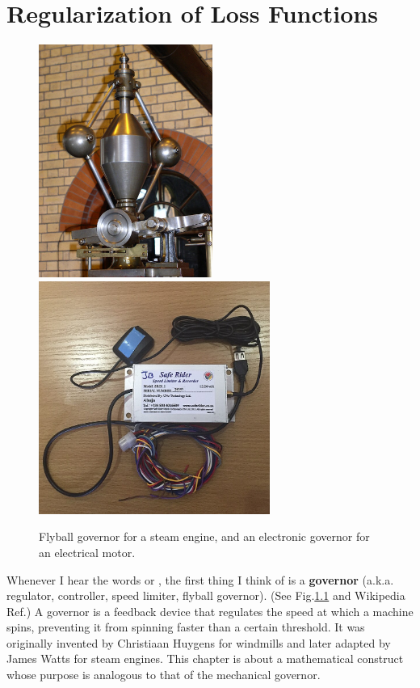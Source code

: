 \chapter{Regularization of Loss Functions}
\label{ch-regularization}

\begin{figure}[h!]
\centering
\includegraphics[height=3in]
{regularization/steam-guv.png}
\includegraphics[height=3in]
{regularization/electronic-guv.png}
\caption{Flyball governor for a steam engine, and an electronic governor for an electrical motor.}
\label{fig-guv-device}
\end{figure}

Whenever I hear the words  or , the first 
thing I think of is a
{\bf governor} (a.k.a. regulator, controller, speed limiter, flyball governor). (See Fig.\ref{fig-guv-device} and Wikipedia Ref.\cite{wiki-guv-device})
A governor is a feedback device that regulates the speed at which 
a machine spins, preventing it from spinning faster than a certain threshold. It was originally invented by Christiaan Huygens for windmills and later adapted by James Watts for steam engines. This chapter is about a mathematical construct whose purpose is analogous to that of the mechanical governor.




